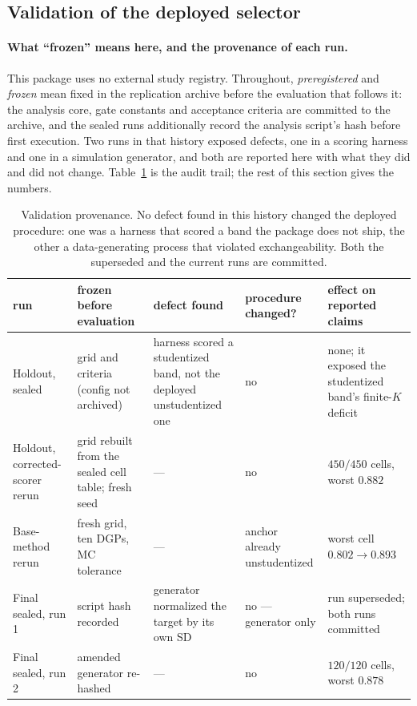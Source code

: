 \documentclass[12pt]{article}
\theoremstyle{definition}
\theoremstyle{remark}
\begin{document}
\subsection{Validation of the deployed selector}\label{sup:robustness}

\paragraph{What ``frozen'' means here, and the provenance of each run.} This
package uses no external study registry. Throughout, \emph{preregistered} and
\emph{frozen} mean fixed in the replication archive before the evaluation
that follows it: the analysis core, gate constants and acceptance criteria
are committed to the archive, and the sealed runs additionally record the
analysis script's hash before first execution. Two runs in that
history exposed defects, one in a scoring harness and one in a simulation
generator, and both are reported here with what they did and did not change.
Table~\ref{tab:provenance} is the audit trail; the rest of this section gives
the numbers.

\begin{table}[htbp]\centering
\caption{Validation provenance. No defect found in this history changed the
deployed procedure: one was a harness that scored a band the package does not
ship, the other a data-generating process that violated exchangeability. Both
the superseded and the current runs are committed.}\label{tab:provenance}
\small
\begin{tabular}{@{}p{2.4cm}p{3.1cm}p{3.4cm}p{1.9cm}p{3.0cm}@{}}
\toprule
run & frozen before evaluation & defect found & procedure changed? & effect on reported claims \\
\midrule
Holdout, sealed & grid and criteria (config not archived) &
harness scored a studentized band, not the deployed unstudentized one &
no & none; it exposed the studentized band's finite-$K$ deficit \\
\addlinespace
Holdout, corrected-scorer rerun & grid rebuilt from the sealed cell table; fresh seed &
--- & no & $450/450$ cells, worst $0.882$ \\
\addlinespace
Base-method rerun & fresh grid, ten DGPs, MC tolerance &
--- & anchor already unstudentized & worst cell $0.802\to0.893$ \\
\addlinespace
Final sealed, run 1 & script hash recorded &
generator normalized the target by its own SD & no --- generator only &
run superseded; both runs committed \\
\addlinespace
Final sealed, run 2 & amended generator re-hashed &
--- & no & $120/120$ cells, worst $0.878$ \\
\bottomrule
\end{tabular}
\end{table}
\end{document}
